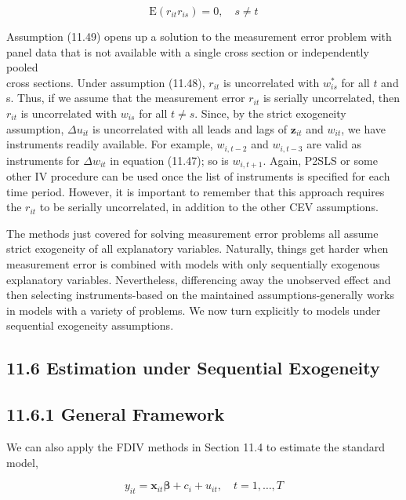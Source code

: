 \documentclass[10pt]{article}
\begin{document}
\begin{equation*}
\mathrm{E}\left(r_{i t} r_{i s}\right)=0, \quad s \neq t \tag{11.49}
\end{equation*}


Assumption (11.49) opens up a solution to the measurement error problem with panel data that is not available with a single cross section or independently pooled\\
cross sections. Under assumption (11.48), $r_{i t}$ is uncorrelated with $w_{i s}^{*}$ for all $t$ and s. Thus, if we assume that the measurement error $r_{i t}$ is serially uncorrelated, then $r_{i t}$ is uncorrelated with $w_{i s}$ for all $t \neq s$. Since, by the strict exogeneity assumption, $\Delta u_{i t}$ is uncorrelated with all leads and lags of $\mathbf{z}_{i t}$ and $w_{i t}$, we have instruments readily available. For example, $w_{i, t-2}$ and $w_{i, t-3}$ are valid as instruments for $\Delta w_{i t}$ in equation (11.47); so is $w_{i, t+1}$. Again, P2SLS or some other IV procedure can be used once the list of instruments is specified for each time period. However, it is important to remember that this approach requires the $r_{i t}$ to be serially uncorrelated, in addition to the other CEV assumptions.

The methods just covered for solving measurement error problems all assume strict exogeneity of all explanatory variables. Naturally, things get harder when measurement error is combined with models with only sequentially exogenous explanatory variables. Nevertheless, differencing away the unobserved effect and then selecting instruments-based on the maintained assumptions-generally works in models with a variety of problems. We now turn explicitly to models under sequential exogeneity assumptions.

\subsection*{11.6 Estimation under Sequential Exogeneity}
\subsection*{11.6.1 General Framework}
We can also apply the FDIV methods in Section 11.4 to estimate the standard model,


\begin{equation*}
y_{i t}=\mathbf{x}_{i t} \boldsymbol{\beta}+c_{i}+u_{i t}, \quad t=1, \ldots, T \tag{11.50}
\end{equation*}
\end{document}

